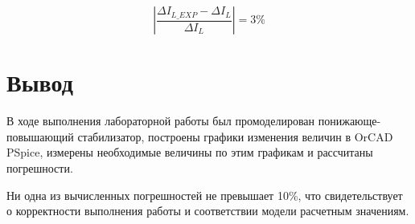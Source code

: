 \[
\left| \frac{\Delta I_{L\_EXP}-\Delta I_L}{\Delta I_L}\right|=3 \%
\]

\chapter{Вывод}

В ходе выполнения лабораторной работы был промоделирован понижающе-повышающий стабилизатор, построены графики изменения величин в OrCAD PSpice, измерены необходимые величины по этим графикам и рассчитаны погрешности.

Ни одна из вычисленных погрешностей не превышает 10\%, что свидетельствует о корректности выполнения работы и соответствии модели расчетным значениям.


